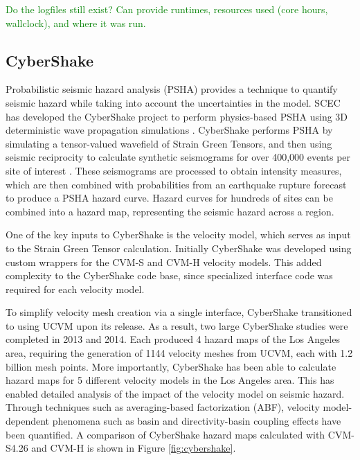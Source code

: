 \textcolor{green}{Do the logfiles still exist? Can provide runtimes, resources used (core hours, wallclock), and where it was run.}



\subsection{CyberShake}

Probabilistic seismic hazard analysis (PSHA) provides a technique to quantify seismic hazard while taking into account the uncertainties in the model.  SCEC has developed the CyberShake project to perform physics-based PSHA using 3D deterministic wave propagation simulations \citep{Graves_2011_PAG}.  CyberShake performs PSHA by simulating a tensor-valued wavefield of Strain Green Tensors, and then using seismic reciprocity to calculate synthetic seismograms for over 400,000 events per site of interest \citep{Zhao_2006_BSSA}.  These seismograms are processed to obtain intensity measures, which are then combined with probabilities from an earthquake rupture forecast to produce a PSHA hazard curve.  Hazard curves for hundreds of sites can be combined into a hazard map, representing the seismic hazard across a region.

One of the key inputs to CyberShake is the velocity model, which serves as input to the Strain Green Tensor calculation.  Initially CyberShake was developed using custom wrappers for the CVM-S and CVM-H velocity models.  This added complexity to the CyberShake code base, since specialized interface code was required for each velocity model.

To simplify velocity mesh creation via a single interface, CyberShake transitioned to using UCVM upon its release. As a result, two large CyberShake studies were completed in 2013 \citep{Callaghan_2013_Proc} and 2014.  Each produced 4 hazard maps of the Los Angeles area, requiring the generation of 1144 velocity meshes from UCVM, each with 1.2 billion mesh points.  More importantly, CyberShake has been able to calculate hazard maps for 5 different velocity models in the Los Angeles area.  This has enabled detailed analysis of the impact of the velocity model on seismic hazard.  Through techniques such as averaging-based factorization (ABF), velocity model-dependent phenomena such as basin and directivity-basin coupling effects have been quantified\citep{Wang_2014_BSSA}.  A comparison of CyberShake hazard maps calculated with CVM-S4.26 and CVM-H is shown in Figure \ref{fig:cybershake}.

